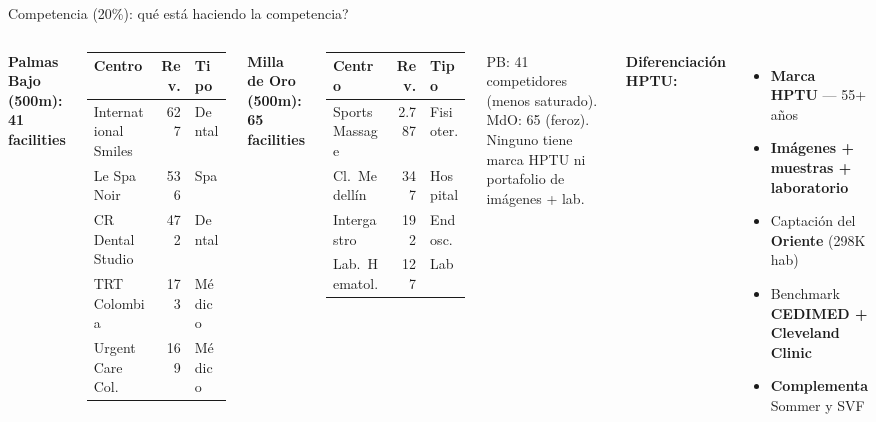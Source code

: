 \documentclass[aspectratio=169, 11pt]{beamer}
\begin{document}
\begin{frame}{\textcolor{comp}{Competencia (20\%)}: \textquestiondown qu\'{e} est\'{a} haciendo la competencia?}

\begin{columns}[T]
\vspace{-2pt}
{\tiny\textbf{Palmas Bajo (500m): 41 facilities}}
\vspace{1pt}

{\tiny
\begin{tabular}{@{}lrl@{}}
\toprule
\textbf{Centro} & \textbf{Rev.} & \textbf{Tipo} \\
\midrule
International Smiles & 627 & Dental \\
Le Spa Noir & 536 & Spa \\
CR Dental Studio & 472 & Dental \\
TRT Colombia & 173 & M\'{e}dico \\
Urgent Care Col. & 169 & M\'{e}dico \\
\bottomrule
\end{tabular}
}

\vspace{2pt}
{\tiny\textbf{Milla de Oro (500m): 65 facilities}}
\vspace{1pt}

{\tiny
\begin{tabular}{@{}lrl@{}}
\toprule
\textbf{Centro} & \textbf{Rev.} & \textbf{Tipo} \\
\midrule
Sports Massage & 2.787 & Fisioter. \\
Cl.\ Medell\'{i}n & 347 & Hospital \\
Intergastro & 192 & Endosc. \\
Lab.\ Hematol. & 127 & Lab \\
\bottomrule
\end{tabular}
}

\vspace{1pt}
{\tiny PB: 41 competidores (menos saturado). MdO: 65 (feroz). Ninguno tiene marca HPTU ni portafolio de im\'{a}genes + lab.}

\vspace{-2pt}
{\scriptsize\textbf{Diferenciaci\'{o}n HPTU:}}
\vspace{1pt}

{\scriptsize
\begin{itemize}\setlength{\itemsep}{1pt}
  \item \textbf{Marca HPTU} --- 55+ a\~{n}os
  \item \textbf{Im\'{a}genes + muestras + laboratorio}
  \item Captaci\'{o}n del \textbf{Oriente} (298K hab)
  \item Benchmark \textbf{CEDIMED + Cleveland Clinic}
  \item \textbf{Complementa} Sommer y SVF
\end{itemize}
}


\end{columns}
\end{frame}
\end{document}
